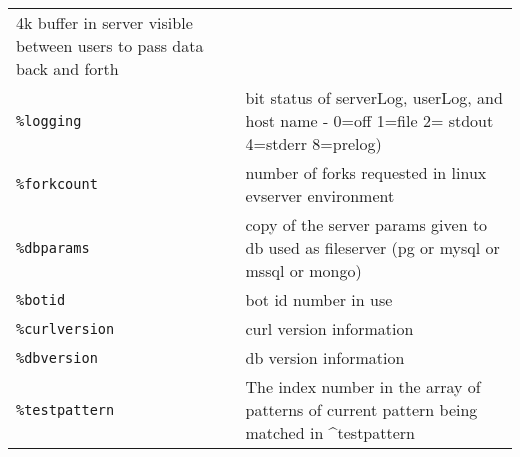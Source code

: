 \documentclass[]{article}
\begin{document}
\begin{longtable}[]{@{}ll@{}}
\begin{minipage}[t]{0.10\columnwidth}
4k buffer in server visible between users to pass data back and
forth\strut
\end{minipage}\tabularnewline
\begin{minipage}[t]{0.12\columnwidth}\raggedright\strut
\texttt{\%logging}\strut
\end{minipage} & \begin{minipage}[t]{0.10\columnwidth}\raggedright\strut
bit status of serverLog, userLog, and host name - 0=off 1=file 2= stdout
4=stderr 8=prelog)\strut
\end{minipage}\tabularnewline
\begin{minipage}[t]{0.12\columnwidth}\raggedright\strut
\texttt{\%forkcount}\strut
\end{minipage} & \begin{minipage}[t]{0.10\columnwidth}\raggedright\strut
number of forks requested in linux evserver environment\strut
\end{minipage}\tabularnewline
\begin{minipage}[t]{0.12\columnwidth}\raggedright\strut
\texttt{\%dbparams}\strut
\end{minipage} & \begin{minipage}[t]{0.10\columnwidth}\raggedright\strut
copy of the server params given to db used as fileserver (pg or mysql or
mssql or mongo)\strut
\end{minipage}\tabularnewline
\begin{minipage}[t]{0.12\columnwidth}\raggedright\strut
\texttt{\%botid}\strut
\end{minipage} & \begin{minipage}[t]{0.10\columnwidth}\raggedright\strut
bot id number in use\strut
\end{minipage}\tabularnewline
\begin{minipage}[t]{0.12\columnwidth}\raggedright\strut
\texttt{\%curlversion}\strut
\end{minipage} & \begin{minipage}[t]{0.10\columnwidth}\raggedright\strut
curl version information\strut
\end{minipage}\tabularnewline
\begin{minipage}[t]{0.12\columnwidth}\raggedright\strut
\texttt{\%dbversion}\strut
\end{minipage} & \begin{minipage}[t]{0.10\columnwidth}\raggedright\strut
db version information\strut
\end{minipage}\tabularnewline
\begin{minipage}[t]{0.12\columnwidth}\raggedright\strut
\texttt{\%testpattern}\strut
\end{minipage} & \begin{minipage}[t]{0.10\columnwidth}\raggedright\strut
The index number in the array of patterns of current pattern being
matched in \^{}testpattern\strut
\end{minipage}\tabularnewline
\bottomrule
\end{longtable}
\end{document}

